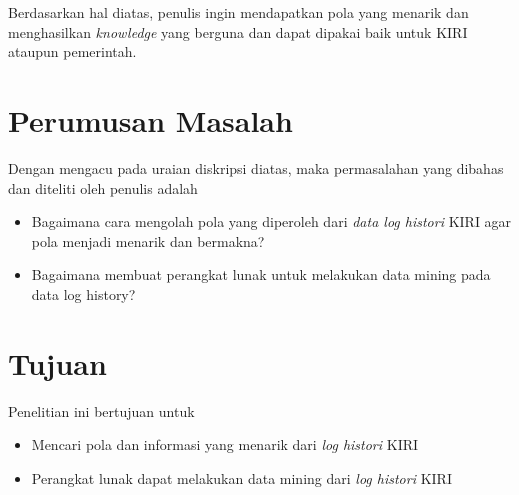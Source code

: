 Berdasarkan hal diatas, penulis ingin mendapatkan pola yang menarik dan menghasilkan \textsl{knowledge} yang berguna dan dapat dipakai baik untuk KIRI ataupun pemerintah.





\section{Perumusan Masalah}
Dengan mengacu pada uraian diskripsi diatas, maka permasalahan yang dibahas dan diteliti oleh penulis adalah
\begin{itemize}
	\item Bagaimana cara mengolah pola yang diperoleh dari \textsl{data log histori}  KIRI agar pola menjadi menarik dan bermakna?
	\item Bagaimana membuat perangkat lunak untuk melakukan data mining pada data log history?
\end{itemize}

\section{Tujuan}
Penelitian ini bertujuan untuk 
\begin{itemize}
	\item Mencari pola dan informasi yang menarik dari \textsl{log histori} KIRI
	\item Perangkat lunak dapat melakukan data mining dari \textsl{log histori} KIRI
\end{itemize}

